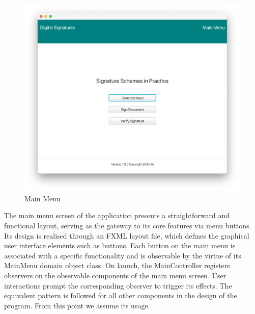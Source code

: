 \documentclass[]{final_report}
\theoremstyle{definition}
\begin{document}
\begin{figure}[H]
    \centering
    \includegraphics[scale=0.4]{main_pictures/ui/mainMenu.png}
    \caption{Main Menu}
\end{figure}
The main menu screen of the application presents a straightforward and functional layout, serving as the gateway to its core features via menu buttons. Its design is realised through an FXML layout file, which defines the graphical user interface elements such as buttons. Each button on the main menu is associated with a specific functionality and is observable by the virtue of its MainMenu domain object class. On launch, the MainController registers observers on the observable components of the main menu screen. User interactions prompt the corresponding observer to trigger its effects. The equivalent pattern is followed for all other components in the design of the program. From this point we assume its usage.
\end{document}
